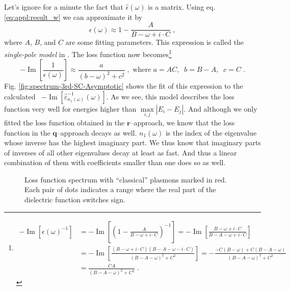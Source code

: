 \documentclass[a4paper,12pt]{article}
\begin{document}
    Let's ignore for a minute the fact that $\hat\epsilon(\omega)$ is a matrix. Using eq. \eqref{eq:appl:result_w} we can approximate it by 
    \begin{equation*}
        \epsilon(\omega) \approx 1 - \frac{A}{B - \omega + i\cdot C} \; ,
    \end{equation*}
    where $A$, $B$, and $C$ are some fitting parameters. This expression is called the \textit{single-pole model} in \cite{andersen2012spatially}. The loss function now becomes\footnote{ %
    \begin{equation*}
        \begin{aligned}
        -\operatorname{Im}[\epsilon(\omega)^{-1}] &= -\operatorname{Im}\left[\left(1 - \frac{A}{B - \omega + i\cdot C}\right)^{-1}\right]
        = -\operatorname{Im}\left[\frac{B - \omega + i\cdot C}{B - A - \omega + i\cdot C}\right] \\
        &= -\operatorname{Im}\left[\frac{(B - \omega + i\cdot C)(B - A - \omega - i\cdot C)}{(B - A - \omega)^2 + C^2}\right]
        = -\frac{-C(B - \omega) + C(B - A - \omega)}{(B - A - \omega)^2 + C^2} \\
        &= \frac{CA}{(B - A - \omega)^2 + C^2} \; .
        \end{aligned}
    \end{equation*}
    } %
    \begin{equation} \label{eq:exp:asymptotic_approx}
        -\operatorname{Im}\left[\frac{1}{\epsilon(\omega)}\right] \approx \frac{a}{(b - \omega)^2 + c^2} \;,\text{ where }a=AC ,\;\; b = B-A ,\;\; c = C\;.
    \end{equation}
    Fig. \ref{fig:spectrum-3rd-SC-Asymptotic} shows the fit of this expression to the calculated \ $-\operatorname{Im}[\hat\varepsilon^{-1}_{n_1(\omega)}(\omega)]$. As we see, this model describes the loss function very well for energies higher than $\underset{i,j}{\operatorname{max}}|E_i - E_j|$. And although we only fitted the loss function obtained in the $\mathbf{r}$--approach, we know that the loss function in the $\mathbf{q}$--approach decays as well. $n_1(\omega)$ is the index of the eigenvalue whose inverse has the highest imaginary part. We thus know that imaginary parts of inverses of all other eigenvalues decay at least as fast. And thus a linear combination of them with coefficients smaller than one does so as well.

    \begin{figure}[h] 
    \center
    
    \caption{Loss function spectrum with ``classical'' plasmons marked in red. Each pair of dots indicates a range where the real part of the dielectric function switches sign.}
    \label{fig:spectrum-3rd-SC}
    \end{figure}
\end{document}
